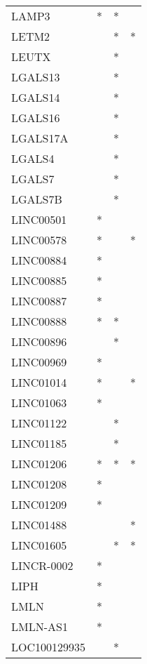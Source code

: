 \begin{longtable}{lccc}
LAMP3            &     * &  * &         \\
LETM2            &       &  * &       * \\
LEUTX            &       &  * &         \\
LGALS13          &       &  * &         \\
LGALS14          &       &  * &         \\
LGALS16          &       &  * &         \\
LGALS17A         &       &  * &         \\
LGALS4           &       &  * &         \\
LGALS7           &       &  * &         \\
LGALS7B          &       &  * &         \\
LINC00501        &     * &    &         \\
LINC00578        &     * &    &       * \\
LINC00884        &     * &    &         \\
LINC00885        &     * &    &         \\
LINC00887        &     * &    &         \\
LINC00888        &     * &  * &         \\
LINC00896        &       &  * &         \\
LINC00969        &     * &    &         \\
LINC01014        &     * &    &       * \\
LINC01063        &     * &    &         \\
LINC01122        &       &  * &         \\
LINC01185        &       &  * &         \\
LINC01206        &     * &  * &       * \\
LINC01208        &     * &    &         \\
LINC01209        &     * &    &         \\
LINC01488        &       &    &       * \\
LINC01605        &       &  * &       * \\
LINCR-0002       &     * &    &         \\
LIPH             &     * &    &         \\
LMLN             &     * &    &         \\
LMLN-AS1         &     * &    &         \\
LOC100129935     &       &  * &         \\

\end{longtable}
